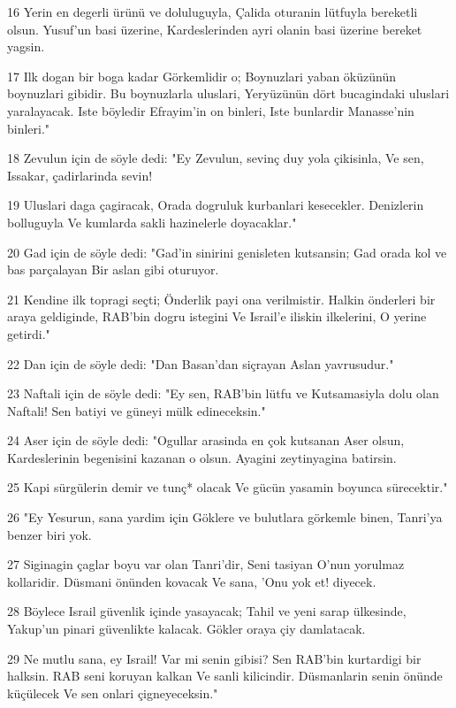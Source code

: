 \par 16 Yerin en degerli ürünü ve doluluguyla, Çalida oturanin lütfuyla bereketli olsun. Yusuf'un basi üzerine, Kardeslerinden ayri olanin basi üzerine bereket yagsin.
\par 17 Ilk dogan bir boga kadar Görkemlidir o; Boynuzlari yaban öküzünün boynuzlari gibidir. Bu boynuzlarla uluslari, Yeryüzünün dört bucagindaki uluslari yaralayacak. Iste böyledir Efrayim'in on binleri, Iste bunlardir Manasse'nin binleri."
\par 18 Zevulun için de söyle dedi: "Ey Zevulun, sevinç duy yola çikisinla, Ve sen, Issakar, çadirlarinda sevin!
\par 19 Uluslari daga çagiracak, Orada dogruluk kurbanlari kesecekler. Denizlerin bolluguyla Ve kumlarda sakli hazinelerle doyacaklar."
\par 20 Gad için de söyle dedi: "Gad'in sinirini genisleten kutsansin; Gad orada kol ve bas parçalayan Bir aslan gibi oturuyor.
\par 21 Kendine ilk topragi seçti; Önderlik payi ona verilmistir. Halkin önderleri bir araya geldiginde, RAB'bin dogru istegini Ve Israil'e iliskin ilkelerini, O yerine getirdi."
\par 22 Dan için de söyle dedi: "Dan Basan'dan siçrayan Aslan yavrusudur."
\par 23 Naftali için de söyle dedi: "Ey sen, RAB'bin lütfu ve Kutsamasiyla dolu olan Naftali! Sen batiyi ve güneyi mülk edineceksin."
\par 24 Aser için de söyle dedi: "Ogullar arasinda en çok kutsanan Aser olsun, Kardeslerinin begenisini kazanan o olsun. Ayagini zeytinyagina batirsin.
\par 25 Kapi sürgülerin demir ve tunç* olacak Ve gücün yasamin boyunca sürecektir."
\par 26 "Ey Yesurun, sana yardim için Göklere ve bulutlara görkemle binen, Tanri'ya benzer biri yok.
\par 27 Siginagin çaglar boyu var olan Tanri'dir, Seni tasiyan O'nun yorulmaz kollaridir. Düsmani önünden kovacak Ve sana, 'Onu yok et! diyecek.
\par 28 Böylece Israil güvenlik içinde yasayacak; Tahil ve yeni sarap ülkesinde, Yakup'un pinari güvenlikte kalacak. Gökler oraya çiy damlatacak.
\par 29 Ne mutlu sana, ey Israil! Var mi senin gibisi? Sen RAB'bin kurtardigi bir halksin. RAB seni koruyan kalkan Ve sanli kilicindir. Düsmanlarin senin önünde küçülecek Ve sen onlari çigneyeceksin."


